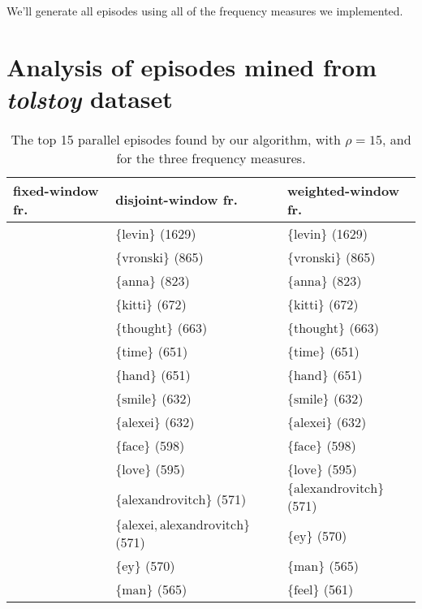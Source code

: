 We'll generate all episodes using all of the frequency measures we implemented.

\section{Analysis of episodes mined from \emph{tolstoy} dataset}

\begin{table}


\begin{tabulary}{\textwidth}{L|L|L}

fixed-window fr. & disjoint-window fr. & weighted-window fr. \\
\hline
& $ \{ \text{levin} \} $ (1629) & $ \{ \text{levin} \} $ (1629) \\
& $ \{ \text{vronski} \} $ (865) & $ \{ \text{vronski} \} $ (865) \\
& $ \{ \text{anna} \} $ (823) & $ \{ \text{anna} \} $ (823) \\
& $ \{ \text{kitti} \} $ (672) & $ \{ \text{kitti} \} $ (672) \\
& $ \{ \text{thought} \} $ (663) & $ \{ \text{thought} \} $ (663) \\
& $ \{ \text{time} \} $ (651) & $ \{ \text{time} \} $ (651) \\
& $ \{ \text{hand} \} $ (651) & $ \{ \text{hand} \} $ (651) \\
& $ \{ \text{smile} \} $ (632) & $ \{ \text{smile} \} $ (632) \\
& $ \{ \text{alexei} \} $ (632) & $ \{ \text{alexei} \} $ (632) \\
& $ \{ \text{face} \} $ (598) & $ \{ \text{face} \} $ (598) \\
& $ \{ \text{love} \} $ (595) & $ \{ \text{love} \} $ (595) \\
& $ \{ \text{alexandrovitch} \} $ (571) & $ \{ \text{alexandrovitch} \} $ (571) \\
& $ \{ \text{alexei}, \text{alexandrovitch} \} $ (571) & $ \{ \text{ey} \} $ (570) \\
& $ \{ \text{ey} \} $ (570) & $ \{ \text{man} \} $ (565) \\
& $ \{ \text{man} \} $ (565) & $ \{ \text{feel} \} $ (561) \\

\end{tabulary}

\caption{The top 15 parallel episodes found by our algorithm, with $ \rho = 15 $, and for the three frequency measures.}
\label{table:fmw-tolstoy-top-15-all-episodes}
\end{table}


